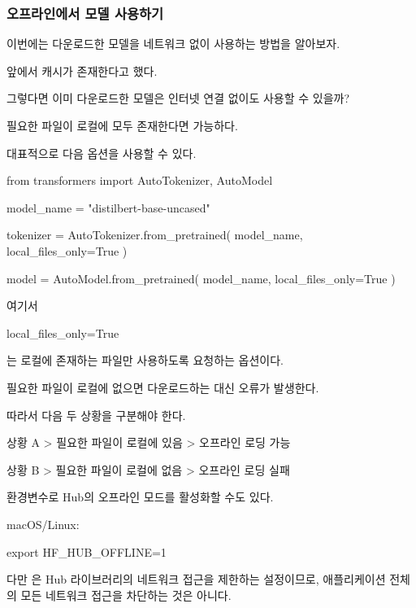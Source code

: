 \subsubsection{오프라인에서 모델 사용하기}

이번에는 다운로드한 모델을 네트워크 없이 사용하는 방법을 알아보자.

앞에서 캐시가 존재한다고 했다.

그렇다면 이미 다운로드한 모델은 인터넷 연결 없이도 사용할 수 있을까?

필요한 파일이 로컬에 모두 존재한다면 가능하다.

대표적으로 다음 옵션을 사용할 수 있다.

\begin{dhkcode}
from transformers import AutoTokenizer, AutoModel

model_name = "distilbert-base-uncased"

tokenizer = AutoTokenizer.from_pretrained(
    model_name,
    local_files_only=True
)

model = AutoModel.from_pretrained(
    model_name,
    local_files_only=True
)
\end{dhkcode}

여기서

\begin{dhkcode}
local_files_only=True
\end{dhkcode}

는 로컬에 존재하는 파일만 사용하도록 요청하는 옵션이다.

필요한 파일이 로컬에 없으면 다운로드하는 대신 오류가 발생한다.

따라서 다음 두 상황을 구분해야 한다.

\begin{dhkdir}[in=6]
상황 A
> 필요한 파일이 로컬에 있음
> 오프라인 로딩 가능
\end{dhkdir}

\begin{dhkdir}[in=6]
상황 B
> 필요한 파일이 로컬에 없음
> 오프라인 로딩 실패
\end{dhkdir}

환경변수로 Hub의 오프라인 모드를 활성화할 수도 있다.

macOS/Linux:

\begin{dhkzsh}
export HF_HUB_OFFLINE=1
\end{dhkzsh}

다만 은 Hub 라이브러리의 네트워크 접근을 제한하는 설정이므로, 애플리케이션 전체의 모든 네트워크 접근을 차단하는 것은 아니다.

